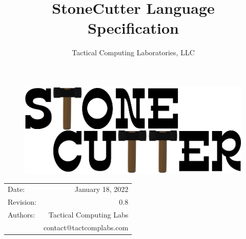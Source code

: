 \documentclass{article}
\title{StoneCutter Language\\Specification} %
\author{Tactical Computing Laboratories, LLC} %
\date{} %
\begin{document}
\begin{figure}
\begin{center}
\includegraphics[width=5in]{figures/stonecutter.png} %
\end{center}
\end{figure}

\maketitle %
\thispagestyle{fancy} %

\begin{center}
\begin{tabular}{l r}
Date: & January 18, 2022 \\ %
Revision: & 0.8 \\         %
Authors: & Tactical Computing Labs\\ %
& contact@tactcomplabs.com\\
\end{tabular}
\end{center}



\clearpage
\tableofcontents
\clearpage


\clearpage
\listoffigures
\lstlistoflistings
\listoftables
\clearpage
\end{document}
